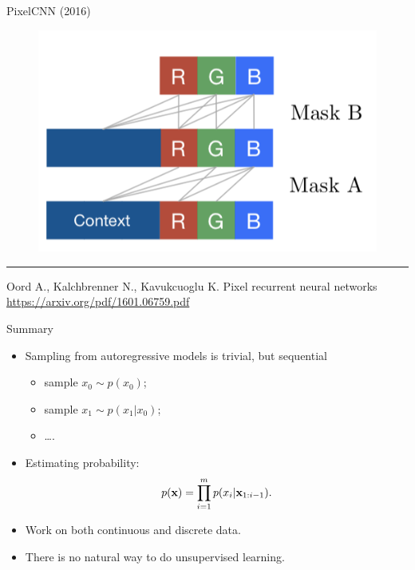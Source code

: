 \begin{frame}{PixelCNN (2016)}
\begin{minipage}[t]{0.5\columnwidth}
\begin{figure}[h]
	\end{figure}
	\vspace{-0.4cm}
	\begin{figure}
		\centering
        \includegraphics[width=0.65\linewidth]{figs/pixelcnn2.png}
	\end{figure}
\end{minipage}
\vfill
\hrule\medskip
{\scriptsize Oord A., Kalchbrenner N., Kavukcuoglu K. Pixel recurrent neural networks \href{https://arxiv.org/pdf/1601.06759.pdf}{https://arxiv.org/pdf/1601.06759.pdf}}
\end{frame}
\begin{frame}{Summary}
    \begin{itemize}
        \item Sampling from autoregressive models is trivial, but sequential
        \begin{itemize}
            \item sample $x_0 \sim p(x_0)$;
            \item sample $x_1 \sim p(x_1 | x_0)$;
            \item \dots.
        \end{itemize}
        \item Estimating probability:
        \[
            p(\mathbf{x}) = \prod_{i=1}^m p(x_i | \mathbf{x}_{1:i - 1}).
        \]
        \item Work on both continuous and discrete data.
        \item There is no natural way to do unsupervised learning.
    \end{itemize}
\end{frame}
